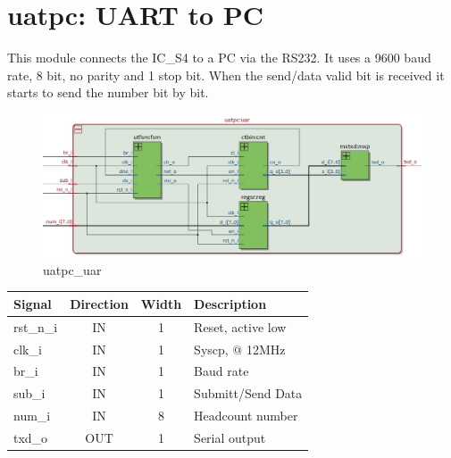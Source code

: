 \documentclass[12pt,a4 paper] {report}
\begin{document}
\section{uatpc: UART to PC}
This module connects the IC\_S4 to a PC via the RS232. It uses a 9600 baud rate, 8 bit, no parity and 1 stop bit. When 
the send/data valid bit is received it starts to send the number bit by bit.
\begin{figure}[h]
	\centering	
	\includegraphics[scale=0.3]{../png/uatpc_uar.png}
	\caption{uatpc\_uar}
\end{figure}
\begin{center}
	\begin{tabular}{ | p{2cm} | c | c | p{5cm} |}
		\hline
		\textbf{Signal} & \textbf{Direction} & \textbf{Width} & \textbf{Description} \\
		\hline	
  	rst\_n\_i & IN & 1 & Reset, active low\\
  	\hline
		clk\_i & IN & 1 & Syscp, @ 12MHz \\
		\hline
		br\_i & IN & 1 & Baud rate \\
		\hline
		sub\_i & IN & 1 & Submitt/Send Data \\
		\hline
		num\_i & IN & 8 & Headcount number \\
		\hline
		txd\_o & OUT & 1 & Serial output \\
		\hline
	\end{tabular}
\end{center}

\newpage
\end{document}
